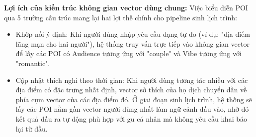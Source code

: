\textbf{Lợi ích của kiến trúc không gian vector dùng chung:}
Việc biểu diễn POI qua 5 trường cấu trúc mang lại hai lợi thế chính cho pipeline sinh lịch trình:
\begin{itemize}
    \item Khớp nối ý định: Khi người dùng nhập yêu cầu dạng tự do (ví dụ: "địa điểm lãng mạn cho hai người"), hệ thống truy vấn trực tiếp vào không gian vector để lấy các POI có Audience tương ứng với "couple" và Vibe tương ứng với "romantic".
    \item Cập nhật thích nghi theo thời gian: Khi người dùng tương tác nhiều với các địa điểm có đặc trưng nhất định, vector sở thích của họ dịch chuyển dần về phía cụm vector của các địa điểm đó. Ở giai đoạn sinh lịch trình, hệ thống sẽ lấy các POI nằm gần vector người dùng nhất làm ngữ cảnh đầu vào, nhờ đó kết quả đầu ra tự động phù hợp với gu cá nhân mà không yêu cầu khai báo lại từ đầu.
\end{itemize}